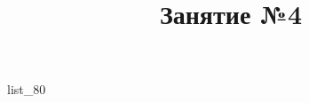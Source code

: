 \documentclass[12pt, a4paper]{article}
\begin{document}
	\title{Занятие №4}
	{list_80}
\end{document}
